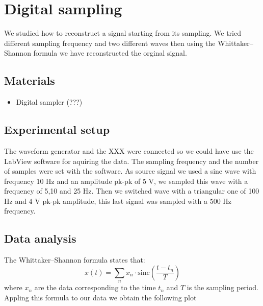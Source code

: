 \chapter{Digital sampling}
We studied how to reconstruct a signal starting from its sampling. We tried different sampling frequency and two different waves then using the Whittaker–Shannon formula we have reconstructed the orginal signal. 

\section{Materials}
\begin{itemize}
\item Digital sampler (???)
\end{itemize}
\section{Experimental setup}
The waveform generator and the XXX were connected so we could have use the LabView software for aquiring the data. The sampling frequency and the number of samples were set with the software. As source signal we used a sine wave with frequency $10$ Hz and an amplitude pk-pk of $5$ V, we sampled this wave with a frequency of 5,10 and 25 Hz. Then we switched wave with a triangular one of 100 Hz and 4 V pk-pk amplitude, this last signal was sampled with a 500 Hz frequency.
\section{Data analysis}
The Whittaker–Shannon formula states that:
\[x(t) = \sum_n x_n\cdot\text{sinc}\left(\frac{t-t_n}{T}\right)\]
where $x_n$ are the data corresponding to the time $t_n$ and $T$ is the sampling period. Appling this formula to our data we obtain the following plot
